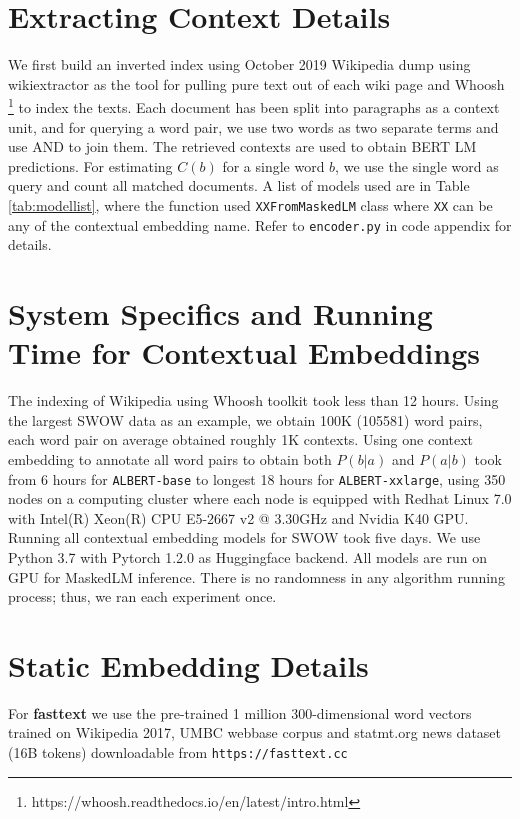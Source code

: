 \documentclass[letterpaper]{article} %
\begin{document}
\section{Extracting Context Details}
We first build an inverted index using October 2019 Wikipedia dump using wikiextractor \cite{Wikiextractor2015} as the tool for pulling pure text out of each wiki page and Whoosh \footnote{https://whoosh.readthedocs.io/en/latest/intro.html} to index the texts. Each document has been split into paragraphs as a context unit, and for querying a word pair, we use two words as two separate terms and use AND to join them. The retrieved contexts are used to obtain BERT LM predictions. For estimating $C(b)$ for a single word $b$, we use the single word as query and count all matched documents. A list of models used are in Table \ref{tab:modellist}, where the function used \texttt{XXFromMaskedLM} class where \texttt{XX} can be any of the contextual embedding name. Refer to \texttt{encoder.py} in code appendix for details. 


\section{System Specifics and Running Time for Contextual Embeddings}
The indexing of Wikipedia using Whoosh toolkit took less than 12 hours. Using the largest SWOW data as an example, we obtain 100K (105581) word pairs, each word pair on average obtained roughly 1K contexts. Using one context embedding to annotate all word pairs to obtain both $P(b|a)$ and $P(a|b)$ took from 6 hours for \texttt{ALBERT-base} to longest 18 hours for \texttt{ALBERT-xxlarge}, using 350 nodes on a computing cluster where each node is equipped with Redhat Linux 7.0 with Intel(R) Xeon(R) CPU E5-2667 v2 @ 3.30GHz and  Nvidia K40 GPU. Running all contextual embedding models for SWOW took five days. We use Python 3.7 with Pytorch 1.2.0 as Huggingface backend. All models are run on GPU for MaskedLM inference. There is no randomness in any algorithm running process; thus, we ran each experiment once. 

\section{Static Embedding Details}
For \textbf{fasttext} we use the pre-trained 1 million 300-dimensional word vectors trained on Wikipedia 2017, UMBC webbase corpus and statmt.org news dataset (16B tokens) downloadable from \texttt{https://fasttext.cc}
\end{document}
